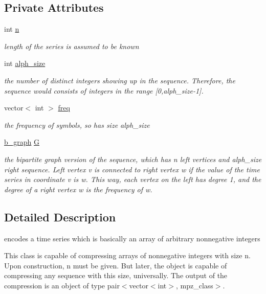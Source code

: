\subsection*{Private Attributes}
\begin{DoxyCompactItemize}
\item 
int \hyperlink{classtime__series__encoder_ab84b7528d50c495fc140f1eb50d9b539}{n}
\begin{DoxyCompactList}\small\item\em length of the series is assumed to be known \end{DoxyCompactList}\item 
int \hyperlink{classtime__series__encoder_a7e73867e25ea5ae643bf05eaf33ea9ac}{alph\+\_\+size}
\begin{DoxyCompactList}\small\item\em the number of distinct integers showing up in the sequence. Therefore, the sequence would consists of integers in the range \mbox{[}0,alph\+\_\+size-\/1\mbox{]}. \end{DoxyCompactList}\item 
vector$<$ int $>$ \hyperlink{classtime__series__encoder_ac6496aa39f28da4d8fe964c495e76057}{freq}
\begin{DoxyCompactList}\small\item\em the frequency of symbols, so has size alph\+\_\+size \end{DoxyCompactList}\item 
\hyperlink{classb__graph}{b\+\_\+graph} \hyperlink{classtime__series__encoder_aa40f761a56f696e78e8888e50e8f45b9}{G}
\begin{DoxyCompactList}\small\item\em the bipartite graph version of the sequence, which has n left vertices and alph\+\_\+size right sequence. Left vertex v is connected to right vertex w if the value of the time series in coordinate v is w. This way, each vertex on the left has degree 1, and the degree of a right vertex w is the frequency of w. \end{DoxyCompactList}\end{DoxyCompactItemize}


\subsection{Detailed Description}
encodes a time series which is basically an array of arbitrary nonnegative integers 

This class is capable of compressing arrays of nonnegative integers with size n. Upon construction, n must be given. But later, the object is capable of compressing any sequence with this size, universally. The output of the compression is an object of type {\ttfamily pair$<$vector$<$int$>$, mpz\+\_\+class$>$}.

